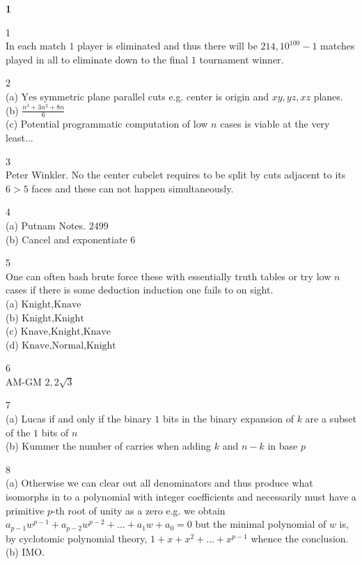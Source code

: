 \Large

\textbf{1}

1 \\
In each match $1$ player is eliminated and thus there will be $\boxed{214,10^{100}-1}$ matches played in all to eliminate down to the final $1$ tournament winner.

2 \\
(a) $\boxed{\text{Yes}}$ symmetric plane parallel cuts e.g. center is origin and $xy,yz,xz$ planes. \\
(b) $\boxed{\frac{n^3+3n^2+8n}{6}}$ \\
(c) Potential programmatic computation of low $n$ cases is viable at the very least...

3 \\
Peter Winkler. $\boxed{\text{No}}$ the center cubelet requires to be split by cuts adjacent to its $6>5$ faces and these can not happen simultaneously.

4 \\
(a) Putnam Notes. $\boxed{2499}$ \\
(b) Cancel and exponentiate $\boxed{6}$

5 \\
One can often bash brute force these with essentially truth tables or try low $n$ cases if there is some deduction induction one fails to on sight. \\
(a) $\boxed{\text{Knight,Knave}}$ \\
(b) $\boxed{\text{Knight,Knight}}$ \\
(c) $\boxed{\text{Knave,Knight,Knave}}$ \\
(d) $\boxed{\text{Knave,Normal,Knight}}$

6 \\
AM-GM $\boxed{2,2\sqrt{3}}$

7 \\
(a) Lucas if and only if the binary $1$ bits in the binary expansion of $k$ are a subset of the $1$ bits of $n$ \\
(b) Kummer the number of carries when adding $k$ and $n-k$ in base $p$

8 \\
(a) Otherwise we can clear out all denominators and thus produce what isomorphs in to a polynomial with integer coefficients and necessarily must have a primitive $p$-th root of unity as a zero e.g. we obtain $a_{p-1} w^{p-1}+a_{p-2} w^{p-2}+\dots +a_1 w+a_0=0$ but the minimal polynomial of $w$ is, by cyclotomic polynomial theory, $1+x+x^2+\dots+x^{p-1}$ whence the conclusion. \\
(b) IMO.

